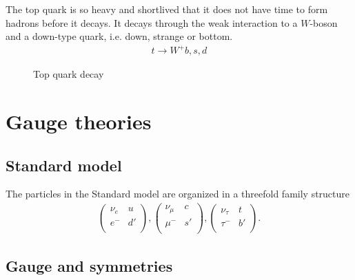 \documentclass[11pt]{article}
\begin{document}
\begin{multicols}{2}
\begin{flushleft}
The top quark is so heavy and shortlived that it does not have time to form hadrons before it decays. It decays through the weak interaction to a $W$-boson and a down-type quark, i.e. down, strange or bottom.
\begin{align*}
t \rightarrow W^+ b,s,d
\end{align*}

\begin{figure}[H]
\centering
{}
\caption{Top quark decay}
\end{figure}
\end{flushleft}


\section{Gauge theories}

\subsection*{Standard model}
\begin{flushleft}
The particles in the Standard model are organized in a threefold family structure
\begin{align*}
\begin{pmatrix}
\nu_e & u\\
e^- & d'\\
\end{pmatrix}, 
\begin{pmatrix}
\nu_{\mu} & c\\
\mu^- & s'\\
\end{pmatrix},
\begin{pmatrix}
\nu_{\tau} & t\\
\tau^- & b'\\
\end{pmatrix}.
\end{align*}
\end{flushleft}

\subsection*{Gauge and symmetries}


\end{multicols}
\end{document}
